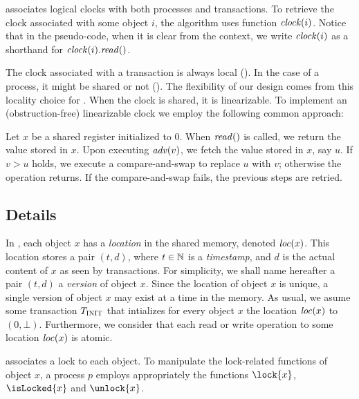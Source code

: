 associates logical clocks with both processes and
transactions.  To retrieve the clock associated with some object $i$,
the algorithm uses function $\clockOf{i}$.  Notice that in the
pseudo-code, when it is clear from the context, we write $\clockOf{i}$
as a shorthand for $\clockOf{i}.\mathit{read}()$.

The clock associated with a transaction is always local ().
In the case of a process, it might be shared or not ().
The flexibility of our design comes from this locality choice for .
When the clock is shared, it is linearizable.
To implement an (obstruction-free) linearizable clock we employ the following common approach:
\begin{construction}
  Let $x$ be a shared register initialized to $0$.
  When $\cread$ is called, we return the value stored in $x$.
  Upon executing $\cadv(v)$, we fetch the value stored in $x$, say $u$.
  If $v > u$ holds, we execute a compare-and-swap to replace $u$ with $v$; 
  otherwise the operation returns.
  If the compare-and-swap fails, the previous steps are retried.
\end{construction}



\subsection{Details}

In , each object $x$ has a \emph{location} in the shared memory, denoted $\locationOf{x}$.
This location stores a pair $(t,d)$, where $t \in \naturalSet$ is a \emph{timestamp}, and $d$ is the actual content of $x$ as seen by transactions.
For simplicity, we shall name hereafter a pair $(t,d)$ a \emph{version} of object $x$.
Since the location of object $x$ is unique, a single version of object $x$ may exist at a time in the memory.
As usual, we asume some transaction $\transInit$ that intializes for every object $x$ the location $\locationOf{x}$ to $(0,\bot)$.
Furthermore, we consider that each read or write operation to some location $\locationOf{x}$ is atomic.

 associates a lock to each object.
To manipulate the lock-related functions of object $x$, 
a process $p$ employs appropriately the functions $\lock{x}$, $\isLocked{x}$ and $\unlock{x}$.

